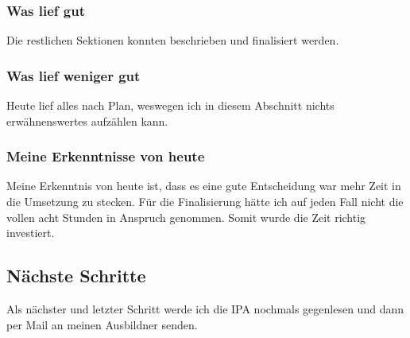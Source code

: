 \subsubsection*{Was lief gut}
Die restlichen Sektionen konnten beschrieben und finalisiert werden.

\subsubsection*{Was lief weniger gut}
Heute lief alles nach Plan, weswegen ich in diesem Abschnitt nichts erwähnenswertes aufzählen kann.

\subsubsection*{Meine Erkenntnisse von heute}
Meine Erkenntnis von heute ist, dass es eine gute Entscheidung war mehr Zeit in die Umsetzung zu stecken. Für die 
Finalisierung hätte ich auf jeden Fall nicht die vollen acht Stunden in Anspruch genommen. Somit wurde die Zeit richtig investiert.

\subsection*{Nächste Schritte}
Als nächster und letzter Schritt werde ich die IPA nochmals gegenlesen und dann per Mail an meinen Ausbildner senden. 

\pagebreak
